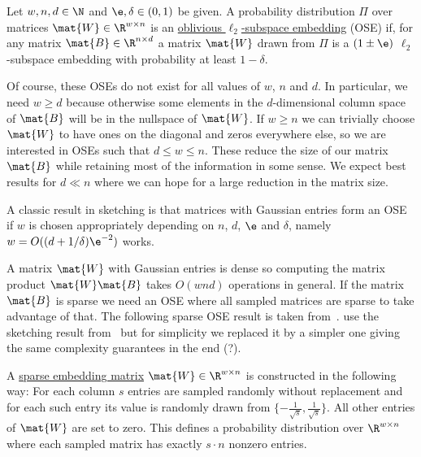 \begin{definition}\label{def:oblivious-subspace-embedding}
Let \(w, n, d \in \N\) and \(\e, \delta \in (0, 1)\) be given.
A probability distribution \(\Pi\) over matrices \(\mat{W} \in \R^{w \times n}\) is an \uline{oblivious \(\ell_2\)-subspace embedding} (OSE) if, for any matrix \(\mat{B} \in \R^{n \times d}\) a matrix \(\mat{W}\) drawn from \(\Pi\) is a \((1\pm\e)\) \(\ell_2\)-subspace embedding with probability at least \(1 - \delta\).
\end{definition}

Of course, these OSEs do not exist for all values of \(w\), \(n\) and \(d\).
In particular, we need \(w \geq d\) because otherwise some elements in the \(d\)-dimensional column space of \(\mat{B}\) will be in the nullspace of \(\mat{W}\).
If \(w \geq n\) we can trivially choose \(\mat{W}\) to have ones on the diagonal and zeros everywhere else, so we are interested in OSEs such that \(d \leq w \leq n\).
These reduce the size of our matrix \(\mat{B}\) while retaining most of the information in some sense.
We expect best results for \(d \ll n\) where we can hope for a large reduction in the matrix size.

A classic result in sketching is that matrices with Gaussian entries form an OSE if \(w\) is chosen appropriately depending on \(n\), \(d\), \(\e\) and \(\delta\), namely \(w = O((d + 1/\delta) \e^{-2})\) works.

A matrix \(\mat{W}\) with Gaussian entries is dense so computing the matrix product \(\mat{W}\mat{B}\) takes \(O(w n d)\) operations in general.
If the matrix \(\mat{B}\) is sparse we need an OSE where all sampled matrices are sparse to take advantage of that.
The following sparse OSE result is taken from~\cite{Cohen-NearlyTightObliviousSubspaceEmbeddings}.
\Textcite{Avron-FasterRandomizedInfeasibleIPMs} use the sketching result from~\cite{Cohen-OptimalApproximateMatrixProduct} but for simplicity we replaced it by a simpler one giving the same complexity guarantees in the end (?).

\begin{definition}
A \uline{sparse embedding matrix} \(\mat{W} \in \R^{w \times n}\) is constructed in the following way:
For each column \(s\) entries are sampled randomly without replacement and for each such entry its value is randomly drawn from \(\{ - \frac{1}{\sqrt{s}}, \frac{1}{\sqrt{s}} \}\).
All other entries of \(\mat{W}\) are set to zero.
This defines a probability distribution over \(\R^{w \times n}\) where each sampled matrix has exactly \(s \cdot n\) nonzero entries.
\end{definition}


